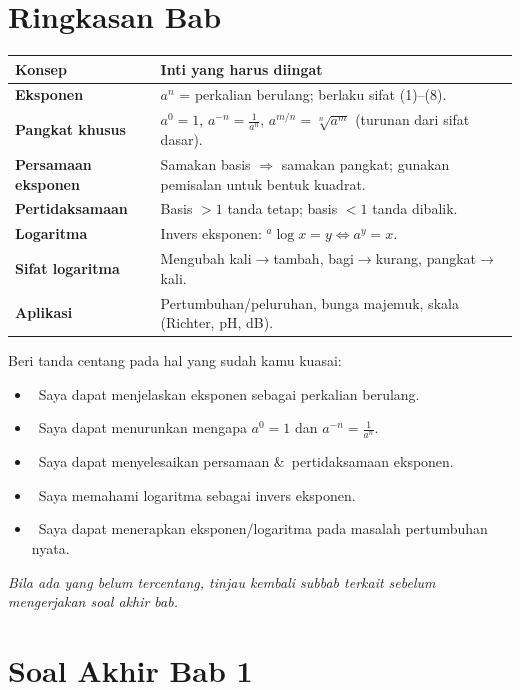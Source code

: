 \documentclass[11pt,a4paper]{report}
\theoremstyle{gaya}
\newcommand{\cek}{\ding{113}\ } %
\begin{document}
\section*{Ringkasan Bab}
\begin{center}
\begin{tabular}{>{\bfseries}p{3.2cm} p{10.5cm}}
\toprule
Konsep & Inti yang harus diingat \\
\midrule
Eksponen & $a^n$ = perkalian berulang; berlaku sifat (1)--(8). \\
Pangkat khusus & $a^0=1$, $a^{-n}=\tfrac{1}{a^n}$, $a^{m/n}=\sqrt[n]{a^m}$ (turunan dari sifat dasar). \\
Persamaan eksponen & Samakan basis $\Rightarrow$ samakan pangkat; gunakan pemisalan untuk bentuk kuadrat. \\
Pertidaksamaan & Basis $>1$ tanda tetap; basis $<1$ tanda dibalik. \\
Logaritma & Invers eksponen: ${}^{a}\!\log x=y\iff a^y=x$. \\
Sifat logaritma & Mengubah kali$\to$tambah, bagi$\to$kurang, pangkat$\to$kali. \\
Aplikasi & Pertumbuhan/peluruhan, bunga majemuk, skala (Richter, pH, dB). \\
\bottomrule
\end{tabular}
\end{center}

\begin{refleksi}
Beri tanda centang pada hal yang sudah kamu kuasai:
\begin{itemize}[leftmargin=*,label={},topsep=2pt]
  \item \cek Saya dapat menjelaskan eksponen sebagai perkalian berulang.
  \item \cek Saya dapat menurunkan mengapa $a^0=1$ dan $a^{-n}=\tfrac1{a^n}$.
  \item \cek Saya dapat menyelesaikan persamaan \&\ pertidaksamaan eksponen.
  \item \cek Saya memahami logaritma sebagai invers eksponen.
  \item \cek Saya dapat menerapkan eksponen/logaritma pada masalah pertumbuhan nyata.
\end{itemize}
\textit{Bila ada yang belum tercentang, tinjau kembali subbab terkait sebelum mengerjakan soal akhir bab.}
\end{refleksi}

\section*{Soal Akhir Bab 1}
\end{document}
